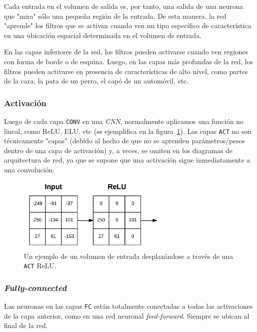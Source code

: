 \documentclass[a4paper,12pt]{article}
\begin{document}
Cada entrada en el volumen de salida es, por tanto, una salida de una neurona que "mira" sólo una pequeña región de la entrada. De esta manera, la red "aprende" los filtros que se activan cuando ven un tipo específico de característica en una ubicación espacial determinada en el volumen de entrada.

En las capas inferiores de la red, los filtros pueden activarse cuando ven regiones con forma de borde o de esquina. Luego, en las capas más profundas de la red, los filtros pueden activarse en presencia de características de alto nivel, como partes de la cara, la pata de un perro, el capó de un automóvil, etc.

\subsubsection{Activación}

Luego de cada capa \texttt{CONV} en una \textit{CNN}, normalmente aplicamos una función no lineal, como ReLU, ELU, etc (se ejemplifica en la figura~\ref{fig:relu-act}). Las capas \texttt{ACT} no son técnicamente "capas" (debido al hecho de que no se aprenden parámetros/pesos dentro de una capa de activación) y, a veces, se omiten en los diagramas de arquitectura de red, ya que se supone que una activación sigue inmediatamente a una convolución.

\begin{figure}[H]
	\begin{center}				
	\includegraphics[width=0.65\textwidth]{tesis_47.png}
  	\caption{Un ejemplo de un volumen de entrada desplazándose a través de una \texttt{ACT} ReLU.}
  	\label{fig:relu-act}
  	\end{center}
\end{figure}

\subsubsection{\textit{Fully-connected}}
Las neuronas en las capas \texttt{FC} están totalmente conectadas a todas las activaciones de la capa anterior, como en una red neuronal \textit{feed-forward}. Siempre se ubican al final de la red.
\end{document}

